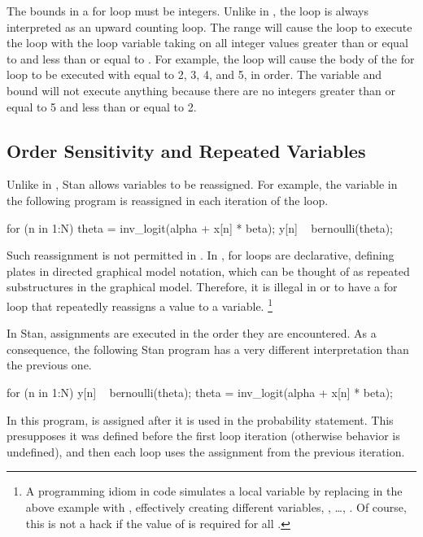 The bounds in a for loop must be integers.  Unlike in \R, the loop is
always interpreted as an upward counting loop.  The range 
will cause the loop to execute the loop with the loop variable taking
on all integer values greater than or equal to  and less than
or equal to .  For example, the loop 
will cause the body of the for loop to be executed with  equal
to 2, 3, 4, and 5, in order.  The variable and bound  will not execute anything because there are no integers
greater than or equal to 5 and less than or equal to 2.

\subsection{Order Sensitivity and Repeated Variables}

Unlike in \BUGS, Stan allows variables to be reassigned.  For
example, the variable  in the following program is
reassigned in each iteration of the loop.
%
\begin{stancode}
for (n in 1:N) {
  theta = inv_logit(alpha + x[n] * beta);
  y[n] ~ bernoulli(theta);
}
\end{stancode}
%
Such reassignment is not permitted in \BUGS.  In \BUGS, for loops are
declarative, defining plates in directed graphical model notation,
which can be thought of as repeated substructures in the graphical
model.  Therefore, it is illegal in \BUGS or \JAGS to have a for loop
that repeatedly reassigns a value to a variable.%
%
\footnote{A programming idiom in \BUGS code simulates
a local variable by replacing  in the above example with
, effectively creating  different variables,
, \ldots, .  Of course, this is not a
hack if the value of  is required for all .}

In Stan, assignments are executed in the order they are encountered.
As a consequence, the following Stan program has a very different
interpretation than the previous one.
%
\begin{stancode}
for (n in 1:N) {
  y[n] ~ bernoulli(theta);
  theta = inv_logit(alpha + x[n] * beta);
}
\end{stancode}
%
In this program,  is assigned after it is used in the
probability statement.  This presupposes it was defined before the
first loop iteration (otherwise behavior is undefined), and then each
loop uses the assignment from the previous iteration.

